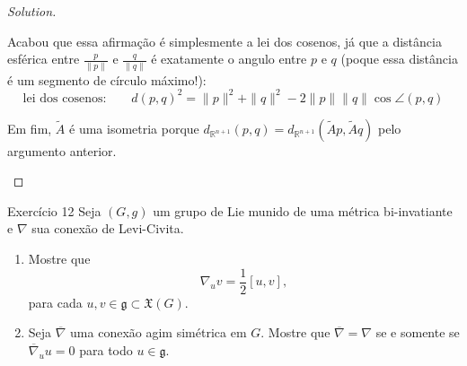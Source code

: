 \begin{proof}[Solution]
\begin{enumerate}[label=(\alph*)]
	Acabou que essa afirmação é simplesmente a lei dos cosenos, já que a distância esférica entre \(\frac{p}{\|p\|}\) e \(\frac{q}{\|q\|}\) é exatamente o angulo entre \(p\) e \(q\) (poque essa distância é um segmento de círculo máximo!):
	\[\text{lei dos cosenos:} \qquad d(p,q)^2=\|p\|^2+\|q\|^2-2\|p\|\|q\| \cos \angle(p,q) \]

Em fim, \(\tilde{A}\) é uma isometria porque \(d_{\mathbb{R}^{n+1}}(p,q)=d_{\mathbb{R}^{n+1}}(\tilde{A}p,\tilde{A}q)\) pelo argumento anterior. 
\end{enumerate}
\end{proof}

\begin{thing4}{Exercício 12}\label{exer:12}\leavevmode
Seja \((G,g)\) um grupo de Lie munido de uma métrica bi-invatiante e \(\nabla\) sua conexão de Levi-Civita.
\begin{enumerate}[label=(\alph*)]
\item Mostre que
	\[\nabla_uv=\frac{1}{2}[u,v],\]
	para cada \(u,v \in \mathfrak{g} \subset \mathfrak{X}(G)\).
\item Seja \(\overline{\nabla}\) uma conexão agim simétrica em \(G\). Mostre que \(\overline{\nabla}=\nabla\) se e somente se \(\overline{\nabla}_uu=0\) para todo \(u \in \mathfrak{g}\).
\end{enumerate}
\end{thing4}


